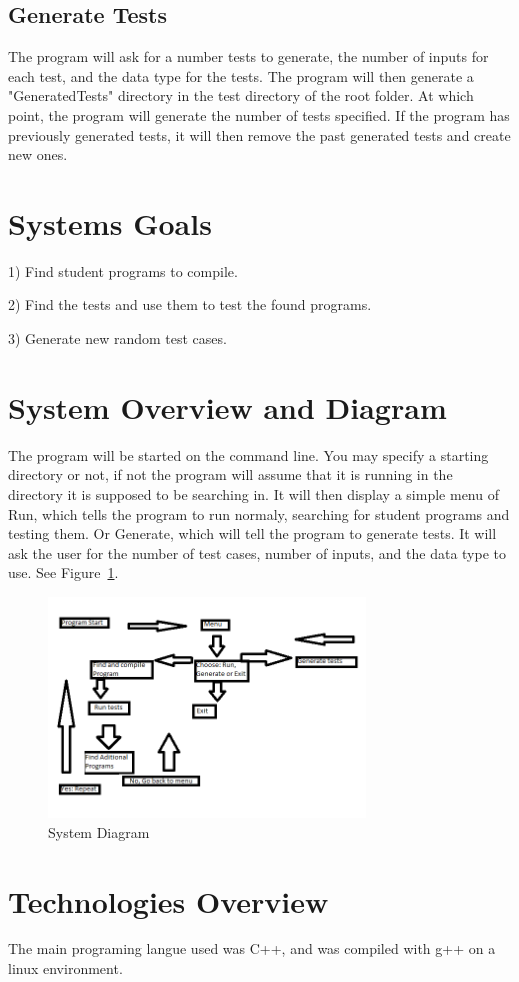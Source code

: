 \subsection{ Generate Tests}
The program will ask for a number tests to generate, the number of inputs for
each test, and the data type for the tests. The program will then generate a "GeneratedTests" directory in the test directory of the root
folder. At which point, the program will generate the number of tests specified. If the program has previously generated tests, it will
then remove the past generated tests and create new ones. 


\section{Systems Goals}
1) Find student programs to compile.

2) Find the tests and use them to test the found programs.

3) Generate new random test cases.

\section{System Overview and Diagram}
The program will be started on the command line. You may specify a starting directory or not, if not the program will assume that it is running in the
directory it is supposed to be searching in. It will then display a simple menu of Run, which tells the program to run normaly,
searching for student programs and testing them. Or Generate, which will tell the program to generate tests. It will ask
the user for the number of test cases, number of inputs, and the data type to use.   See Figure~\ref{systemdiagram}.

\begin{figure}[tbh]
\begin{center}
\includegraphics[width=0.75\textwidth]{./SystemDiagram}
\end{center}
\caption{System Diagram \label{systemdiagram}}
\end{figure}

\section{Technologies Overview}
The main programing langue used was C++, and was compiled with g++ on a linux environment.
